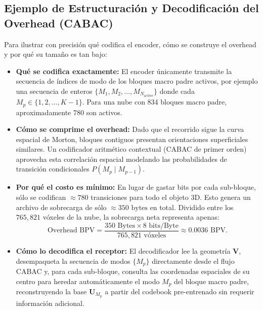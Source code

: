 \documentclass[11pt,a4paper]{article}
\begin{document}
\subsection{Ejemplo de Estructuración y Decodificación del Overhead (CABAC)}
Para ilustrar con precisión qué codifica el encoder, cómo se construye el overhead y por qué su tamaño es tan bajo:
\begin{itemize}
  \item \textbf{Qué se codifica exactamente:} El encoder únicamente transmite la secuencia de índices de modo de los bloques macro padre activos, por ejemplo una secuencia de enteros $\{M_1, M_2, \dots, M_{N_{\text{active}}}\}$ donde cada $M_p \in \{1, 2, \dots, K-1\}$. Para una nube con 834 bloques macro padre, aproximadamente 780 son activos.
  \item \textbf{Cómo se comprime el overhead:} Dado que el recorrido sigue la curva espacial de Morton, bloques contiguos presentan orientaciones superficiales similares. Un codificador aritmético contextual (CABAC de primer orden) aprovecha esta correlación espacial modelando las probabilidades de transición condicionales $P(M_p \mid M_{p-1})$. 
  \item \textbf{Por qué el costo es mínimo:} En lugar de gastar bits por cada sub-bloque, sólo se codifican $\approx 780$ transiciones para todo el objeto 3D. Esto genera un archivo de sobrecarga de sólo $\approx 350\text{ bytes}$ en total. Dividido entre los $765{,}821$ vóxeles de la nube, la sobrecarga neta representa apenas:
  \begin{equation}
    \text{Overhead BPV} = \frac{350 \text{ Bytes} \times 8 \text{ bits/Byte}}{765{,}821 \text{ vóxeles}} \approx 0.0036 \text{ BPV}.
  \end{equation}
  \item \textbf{Cómo lo decodifica el receptor:} El decodificador lee la geometría $\mathbf{V}$, desempaqueta la secuencia de modos $\{M_p\}$ directamente desde el flujo CABAC y, para cada sub-bloque, consulta las coordenadas espaciales de su centro para heredar automáticamente el modo $M_p$ del bloque macro padre, reconstruyendo la base $\mathbf{U}_{M_p}$ a partir del codebook pre-entrenado sin requerir información adicional.
\end{itemize}
\end{document}
